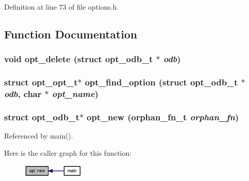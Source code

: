 Definition at line 73 of file options.h.

\subsection{Function Documentation}
\subsubsection[{opt\_\-delete}]{\setlength{\rightskip}{0pt plus 5cm}void opt\_\-delete (struct {\bf opt\_\-odb\_\-t} $\ast$ {\em odb})}\label{options_8h_446211e014d8f5668b0c4ab1eeb463d2}


\subsubsection[{opt\_\-find\_\-option}]{\setlength{\rightskip}{0pt plus 5cm}struct {\bf opt\_\-opt\_\-t}$\ast$ opt\_\-find\_\-option (struct {\bf opt\_\-odb\_\-t} $\ast$ {\em odb}, \/  char $\ast$ {\em opt\_\-name})\hspace{0.3cm}{\tt  [read]}}\label{options_8h_78c3c1709a2ce86dce11dcd2b5b2ae86}


\subsubsection[{opt\_\-new}]{\setlength{\rightskip}{0pt plus 5cm}struct {\bf opt\_\-odb\_\-t}$\ast$ opt\_\-new ({\bf orphan\_\-fn\_\-t} {\em orphan\_\-fn})\hspace{0.3cm}{\tt  [read]}}\label{options_8h_d900f5594c7d1ad23aa395b5dc9b5931}




Referenced by main().

Here is the caller graph for this function:\nopagebreak
\begin{figure}[H]
\begin{center}
\leavevmode
\includegraphics[width=85pt]{options_8h_d900f5594c7d1ad23aa395b5dc9b5931_icgraph}
\end{center}
\end{figure}
